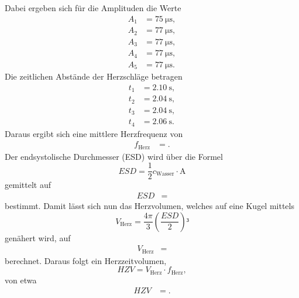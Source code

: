 Dabei ergeben sich für die Amplituden die Werte
\begin{align*}
  A_1 &= \SI{75}{\micro\second},\\
  A_2 &= \SI{77}{\micro\second},\\
  A_3 &= \SI{77}{\micro\second},\\
  A_4 &= \SI{77}{\micro\second},\\
  A_5 &= \SI{77}{\micro\second}.
\end{align*}
Die zeitlichen Abstände der Herzschläge betragen
\begin{align*}
  t_1 &= \SI{2,10}{\second},\\
  t_2 &= \SI{2,04}{\second},\\
  t_3 &= \SI{2,04}{\second},\\
  t_4 &= \SI{2,06}{\second}.
\end{align*}
Daraus ergibt sich eine mittlere Herzfrequenz von
\begin{align*}
  f_{\text{Herz}} &= .
\end{align*}
Der endsystolische Durchmesser (ESD) wird über die Formel
\begin{equation}
  ESD = \frac{1}{2} c_{\text{Wasser}} \cdot \text{A}
\end{equation}
gemittelt auf
\begin{align*}
  ESD &= 
\end{align*}
bestimmt.
Damit lässt sich nun das Herzvolumen, welches auf eine Kugel mittels
\begin{equation}
  V_{\text{Herz}} = \frac{4\pi}{3} \left(\frac{ESD}{2} \right)³
\end{equation}
genähert wird, auf
\begin{align*}
  V_{\text{Herz}} &= 
\end{align*}
berechnet.
Daraus folgt ein Herzzeitvolumen,
\begin{equation}
  HZV = V_{\text{Herz}} \cdot f_{\text{Herz}},
\end{equation}
von etwa
\begin{align*}
  HZV &= .
\end{align*}

